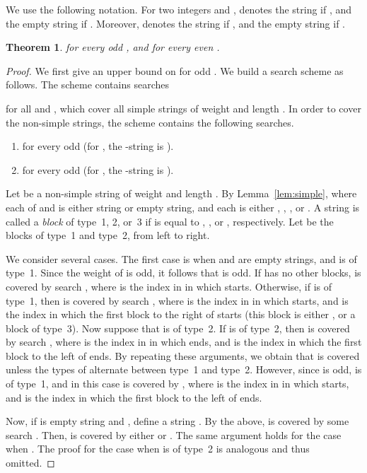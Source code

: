 \documentclass[12pt]{article}
\newtheorem{theorem}{Theorem}
\newif\iffull
\begin{document}
We use the following notation.
For two integers  and ,  denotes the string
 if , and the empty string if .
Moreover,  denotes the string  if ,
and the empty string if .

\begin{theorem}\label{thm:alpha}
 for every odd , and
 for every even .
\end{theorem}
\iffull
\begin{proof}
We first give an upper bound on  for odd .
We build a search scheme as follows.
The scheme contains searches 

for all  and , which cover all simple strings
of weight  and length .
In order to cover the non-simple strings, the scheme contains the following
searches.
\begin{enumerate}
\item  for every odd 
(for , the -string is ).
\item  for every odd 
(for , the -string is ).
\end{enumerate}

Let  be a non-simple string of weight  and length .
By Lemma~\ref{lem:simple},  where each of  and 
is either string  or empty string, and each  is either
, , , or .
A string  is called a \emph{block} of type~1, 2, or~3 if  is
equal to , , or , respectively.
Let  be the blocks of type~1 and type~2, from left to right.

We consider several cases.
The first case is when  and  are empty strings, and  is of type~1.
Since the weight of  is odd, it follows that  is odd.
If  has no other blocks,  is covered by search
, where  is the index in  in which  starts.
Otherwise, if  is of type~1, then  is covered by search
, where  is the index in  in which  starts,
and  is the index in which the first block to the right of  starts
(this block is either , or a block of type~3).
Now suppose that  is of type~2.
If  is of type~2, then  is covered by search
, where  is the index in  in which  ends,
and  is the index in which the first block to the left of  ends.
By repeating these arguments, we obtain that  is covered unless
the types of  alternate between type~1 and type~2.
However, since  is odd,  is of type~1, and in this case
 is covered by ,
where  is the index in  in which  starts,
and  is the index in which the first block to the left of  ends.

Now, if  is empty string and , define a string .
By the above,  is covered by some search .
Then,  is covered by either  or .
The same argument holds for the case when .
The proof for the case when  is of type~2 is analogous and thus omitted.


\end{proof}
\end{document}
